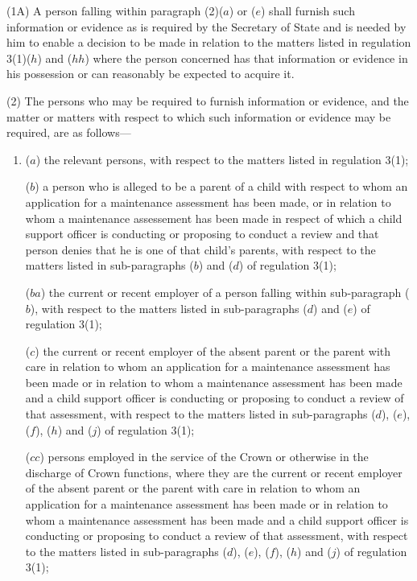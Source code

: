 \documentclass[a4paper,12pt]{article}
\begin{document}
(1A) A person falling within paragraph (2)($a$) or ($e$) shall furnish such information or evidence as is required by the Secretary of State and is needed by him to enable a decision to be made in relation to the matters listed in regulation 3(1)($h$) and ($hh$) where the person concerned has that information or evidence in his possession or can reasonably be expected to acquire it.

(2) The persons who may be required to furnish information or evidence, and the matter or matters with respect to which such information or evidence may be required, are as follows—
\begin{enumerate}\item[]
($a$) the relevant persons, with respect to the matters listed in regulation 3(1);

($b$) a person who is alleged to be a parent of a child with respect to whom an application for a maintenance 
assessment has been made, or in relation to whom a maintenance assessement has been made in respect of which a child support officer is conducting or proposing to conduct a review and that person  %
denies that he is one of that child’s parents, with respect to the matters listed in sub-paragraphs ($b$) and ($d$) of regulation 3(1);

($ba$) the current or recent employer of a person falling within sub-\hspace{0pt}paragraph ($b$), with respect to the matters listed in sub-\hspace{0pt}paragraphs ($d$) and ($e$) of regulation 3(1);

($c$) the current or recent employer of the absent parent or the parent with care in relation to whom an application for a maintenance assessment has been made 
or in relation to whom a maintenance assessment has been made and a child support officer is conducting or proposing to conduct a review of that assessment,  %
with respect to the matters listed in sub-paragraphs ($d$), ($e$), ($f$), ($h$) and ($j$) of regulation 3(1);

($cc$) persons employed in the service of the Crown or otherwise in the discharge of Crown functions, where they are the current or recent employer of the absent parent or the parent with care in relation to whom an application for a maintenance assessment has been made 
or in relation to whom a maintenance assessment has been made and a child support officer is conducting or proposing to conduct a review of that assessment,  %
with respect to the matters listed in sub-paragraphs ($d$), ($e$), ($f$), ($h$) and ($j$) of regulation 3(1);


\end{enumerate}
\end{document}
